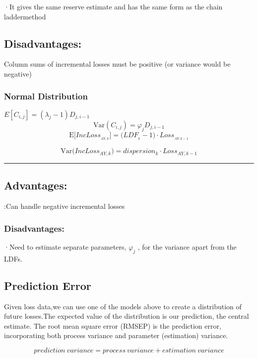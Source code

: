 \documentclass[
]{article}
\begin{document}
·It gives the same reserve estimate and has the same form as the chain
laddermethod

\subsection{Disadvantages:}\label{disadvantages-8}

Column sums of incremental losses must be positive (or variance would be
negative)

\subsubsection{Normal Distribution}\label{normal-distribution}

\(E[C_{i,j}] = (\lambda_j - 1)D_{j,i-1}\)
\[\text{Var}(C_{i,j}) = \varphi_j D_{j,i-1}\]
\[\mathrm{E}\Big[IncLoss_{_{AY,k}}\Big]=\Big(LDF_{_k}-1\Big)\cdot Loss_{_{AY,k-1}}\]

\[\mathrm{Var}\Big(IncLoss_{AY,k}\Big)=dispersion_{k}\cdot Loss_{AY,k-1}\]

\begin{center}\rule{0.5\linewidth}{0.5pt}\end{center}

\subsection{Advantages:}\label{advantages-11}

:Can handle negative incremental losses

\subsubsection{Disadvantages:}\label{disadvantages-9}

·Need to estimate separate parameters, \(\varphi_{j}\) , for the
variance apart from the LDFs.

\subsection{Prediction Error}\label{prediction-error}

Given loss data,we can use one of the models above to create a
distribution of future losses.The expected value of the distribution is
our prediction, the central estimate. The root mean square error (RMSEP)
is the prediction error, incorporating both process variance and
parameter (estimation) variance.

\[\boxed{prediction\:variance=process\:variance+estimation\:variance}\]
\end{document}

